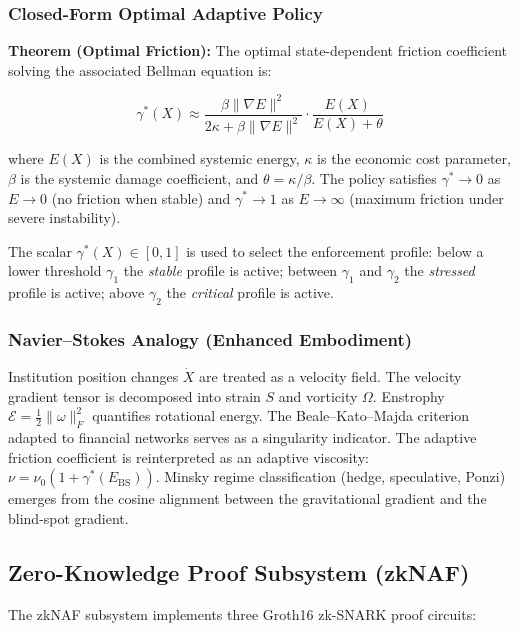 \documentclass[12pt,a4paper]{article}
\begin{document}
\subsubsection{Closed-Form Optimal Adaptive Policy}

\textbf{Theorem (Optimal Friction):} The optimal state-dependent friction
coefficient solving the associated Bellman equation is:

\begin{equation}
\gamma^*(X) \approx
\frac{\beta\|\nabla E\|^2}{2\kappa + \beta\|\nabla E\|^2}\cdot
\frac{E(X)}{E(X)+\theta}
\end{equation}

where $E(X)$ is the combined systemic energy, $\kappa$ is the economic cost
parameter, $\beta$ is the systemic damage coefficient, and
$\theta=\kappa/\beta$. The policy satisfies $\gamma^*\to 0$ as
$E\to 0$ (no friction when stable) and $\gamma^*\to 1$ as $E\to\infty$ (maximum friction under severe instability).

The scalar $\gamma^*(X)\in[0,1]$ is used to select the enforcement profile:
below a lower threshold $\gamma_1$ the \textit{stable} profile is active;
between $\gamma_1$ and $\gamma_2$ the \textit{stressed} profile is active;
above $\gamma_2$ the \textit{critical} profile is active.

\subsubsection{Navier--Stokes Analogy (Enhanced Embodiment)}

Institution position changes $\dot{X}$ are treated as a velocity field.
The velocity gradient tensor is decomposed into strain $S$ and vorticity
$\Omega$. Enstrophy $\mathcal{E} = \frac{1}{2}\|\omega\|_F^2$ quantifies
rotational energy. The Beale--Kato--Majda criterion adapted to financial
networks serves as a singularity indicator. The adaptive friction coefficient
is reinterpreted as an adaptive viscosity:
$\nu = \nu_0(1+\gamma^*(E_{\mathrm{BS}}))$. Minsky regime classification
(hedge, speculative, Ponzi) emerges from the cosine alignment between the
gravitational gradient and the blind-spot gradient.

\subsection{Zero-Knowledge Proof Subsystem (zkNAF)}

The zkNAF subsystem implements three Groth16 zk-SNARK proof circuits:
\end{document}
